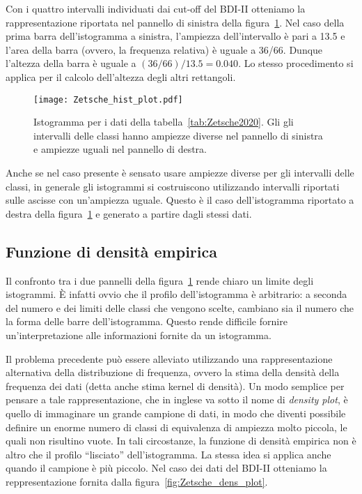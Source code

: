 Con i quattro intervalli individuati dai cut-off del BDI-II otteniamo la rappresentazione riportata nel pannello di sinistra della figura~\ref{fig:Zetsche_hist_plot}. 
Nel caso della prima barra dell'istogramma a sinistra, l'ampiezza dell'intervallo è pari a 13.5 e l'area della barra (ovvero, la frequenza relativa) è uguale a 36/66. 
Dunque l'altezza della barra è uguale a $(36 / 66) / 13.5 = 0.040$.
Lo stesso procedimento si applica per il calcolo dell'altezza degli altri rettangoli.

\begin{figure}
 \centering
 \texttt{[image: Zetsche\_hist\_plot.pdf]}
 \caption{Istogramma per i dati della tabella~\ref{tab:Zetsche2020}. 
 Gli gli intervalli delle classi hanno ampiezze diverse nel pannello di sinistra e ampiezze uguali nel pannello di destra.}
\label{fig:Zetsche_hist_plot}
\end{figure}

Anche se nel caso presente è sensato usare ampiezze diverse per gli intervalli delle classi, in generale gli istogrammi si costruiscono utilizzando intervalli riportati sulle ascisse con un'ampiezza uguale.
Questo è il caso dell'istogramma riportato a destra della figura~\ref{fig:Zetsche_hist_plot} e generato a partire dagli stessi dati. 


\subsection{Funzione di densità empirica}

Il confronto tra i due pannelli della figura~\ref{fig:Zetsche_hist_plot} rende chiaro un limite degli istogrammi. 
È infatti ovvio che il profilo dell'istogramma è arbitrario: a seconda del numero e dei limiti delle classi che vengono scelte, cambiano sia il numero che la forma delle barre dell'istogramma.
Questo rende difficile fornire un'interpretazione alle informazioni fornite da un istogramma.

Il problema precedente può essere alleviato utilizzando una rappresentazione alternativa della distribuzione di frequenza, ovvero la stima della densità della frequenza dei dati (detta anche stima kernel di densità). 
Un modo semplice per pensare a tale rappresentazione, che in inglese va sotto il nome di \emph{density plot}, è quello di immaginare un grande campione di dati, in modo che diventi possibile definire un enorme numero di classi di equivalenza di ampiezza molto piccola, le quali non risultino vuote. 
In tali circostanze, la funzione di densità empirica non è altro che il profilo \enquote{lisciato} dell’istogramma. 
La stessa idea si applica anche quando il campione è più piccolo. 
Nel caso dei dati del BDI-II otteniamo la reppresentazione fornita dalla figura~\ref{fig:Zetsche_dens_plot}. 

